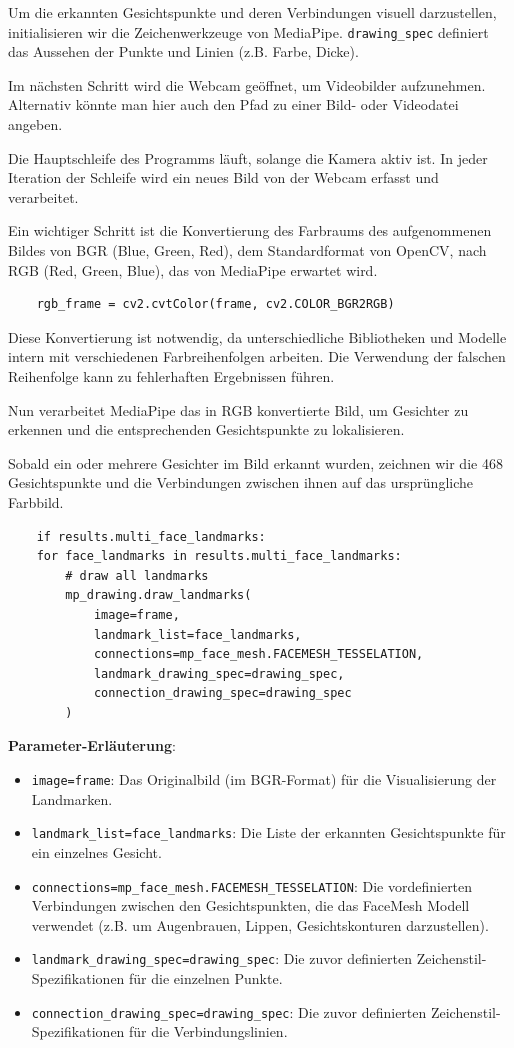 Um die erkannten Gesichtspunkte und deren Verbindungen visuell darzustellen, initialisieren wir die Zeichenwerkzeuge von MediaPipe. \texttt{drawing\_spec} definiert das Aussehen der Punkte und Linien (z.B. Farbe, Dicke).

Im nächsten Schritt wird die Webcam geöffnet, um Videobilder aufzunehmen. Alternativ könnte man hier auch den Pfad zu einer Bild- oder Videodatei angeben. 

Die Hauptschleife des Programms läuft, solange die Kamera aktiv ist. In jeder Iteration der Schleife wird ein neues Bild von der Webcam erfasst und verarbeitet.

Ein wichtiger Schritt ist die Konvertierung des Farbraums des aufgenommenen Bildes von BGR (Blue, Green, Red), dem Standardformat von OpenCV, nach RGB (Red, Green, Blue), das von MediaPipe erwartet wird.
\begin{lstlisting}
    rgb_frame = cv2.cvtColor(frame, cv2.COLOR_BGR2RGB)
\end{lstlisting}
Diese Konvertierung ist notwendig, da unterschiedliche Bibliotheken und Modelle intern mit verschiedenen Farbreihenfolgen arbeiten. Die Verwendung der falschen Reihenfolge kann zu fehlerhaften Ergebnissen führen.

Nun verarbeitet MediaPipe das in RGB konvertierte Bild, um Gesichter zu erkennen und die entsprechenden Gesichtspunkte zu lokalisieren.

Sobald ein oder mehrere Gesichter im Bild erkannt wurden, zeichnen wir die 468 Gesichtspunkte und die Verbindungen zwischen ihnen auf das ursprüngliche Farbbild.
\begin{lstlisting}
    if results.multi_face_landmarks:
    for face_landmarks in results.multi_face_landmarks:
        # draw all landmarks
        mp_drawing.draw_landmarks(
            image=frame,
            landmark_list=face_landmarks,
            connections=mp_face_mesh.FACEMESH_TESSELATION,
            landmark_drawing_spec=drawing_spec,
            connection_drawing_spec=drawing_spec
        )
\end{lstlisting}
\textbf{Parameter-Erläuterung}:
\begin{itemize}
    \item \texttt{image=frame}: Das Originalbild (im BGR-Format) für die Visualisierung der Landmarken.
    \item \texttt{landmark\_list=face\_landmarks}: Die Liste der erkannten Gesichtspunkte für ein einzelnes Gesicht.
    \item \texttt{connections=mp\_face\_mesh.FACEMESH\_TESSELATION}: Die vordefinierten Verbindungen zwischen den Gesichtspunkten, die das FaceMesh Modell verwendet (z.B. um Augenbrauen, Lippen, Gesichtskonturen darzustellen).
    \item \texttt{landmark\_drawing\_spec=drawing\_spec}: Die zuvor definierten Zeichenstil-Spezifikationen für die einzelnen Punkte.
    \item \texttt{connection\_drawing\_spec=drawing\_spec}: Die zuvor definierten Zeichenstil-Spezifikationen für die Verbindungslinien.
\end{itemize}

